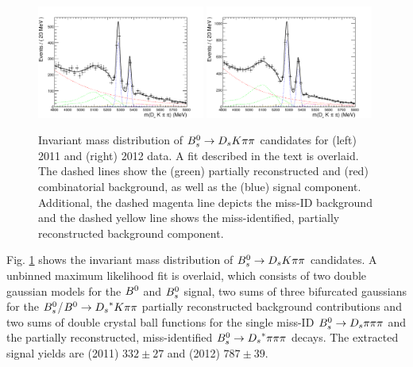 \begin{figure}[h]
\includegraphics[height=7.cm,width=0.49\textwidth]{figs/BmassFit_11.pdf}
\includegraphics[height=7.cm,width=0.49\textwidth]{figs/BmassFit_12.pdf}
\caption{Invariant mass distribution of ${{B}^0_{s}}\rightarrow{\ensuremath{{D}_{s}}}{\ensuremath{K}}{\ensuremath{\pi}}{\ensuremath{\pi}}$ candidates for (left) 2011 and (right) 2012 data.
A fit described in the text is overlaid. The dashed lines show the (green) partially reconstructed and (red) combinatorial background, as well as the (blue) signal component. 
Additional, the dashed magenta line depicts the miss-ID background and the dashed yellow line shows the miss-identified, partially reconstructed background component.}
\label{fig: BsDsKpipiFit}
\end{figure}


Fig. \ref{fig: BsDsKpipiFit} shows the invariant mass distribution of ${{B}^0_{s}}\rightarrow{\ensuremath{{D}_{s}}}{\ensuremath{K}}{\ensuremath{\pi}}{\ensuremath{\pi}}$ candidates. 
A unbinned maximum likelihood fit is overlaid, which consists of two double gaussian models for the ${{B}^0}$ and ${{B}^0_{s}}$ signal, two sums of three bifurcated gaussians for the ${{B}^0_{s}}$/${{B}^0}\rightarrow{\ensuremath{{D}_{s}}}^{*}{K}{\pi}{\pi}$ partially reconstructed background contributions and two sums of double crystal ball functions for the single miss-ID ${{B}^0_{s}}\rightarrow{\ensuremath{{D}_{s}}}{\ensuremath{\pi}}{\ensuremath{\pi}}{\ensuremath{\pi}}$ and the partially reconstructed, miss-identified ${{B}^0_{s}}\rightarrow{\ensuremath{{D}_{s}}}^{*}{\pi}{\pi}{\pi}$ decays. \newline
The extracted signal yields are (2011) $332 \pm  27$ and (2012) $787 \pm 39$.  


